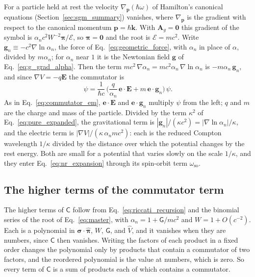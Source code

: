 \documentclass[aps,prd,onecolumn,tightenlines,nofootinbib,notitlepage,11pt,floatfix]{revtex4-2}
\theoremstyle{indentedtheorem}
\begin{document}
For a particle held at rest the velocity $\nabla_{\mathbf{p}}(\hbar\omega)$ of Hamilton's canonical equations (Section~\ref{sec:sgm_summary}) vanishes, where $\nabla_{\mathbf{p}}$ is the gradient with respect to the canonical momentum $\mathbf{p}=\hbar\mathbf{k}$. With $\mathbf{A}_g=\mathbf{0}$ this gradient of the symbol is $\alpha_nc^2W^{-2}\boldsymbol{\pi}/\mathcal{E}$, so $\boldsymbol{\pi}=\mathbf{0}$ and the root is $\mathcal{E}=mc^2$. Write $\mathbf{g}_n\equiv-c^2\nabla\ln \alpha_n$, the force of Eq.~\eqref{eq:geometric_force}, with $\alpha_n$ in place of $\alpha$, divided by $m\alpha_n$; for $\alpha_n$ near $1$ it is the Newtonian field $\mathbf{g}$ of Eq.~\eqref{eq:g_grad_alpha}. Then the term $mc^2\,\nabla\alpha_n=mc^2\alpha_n\,\nabla\ln\alpha_n$ is $-m\alpha_n\,\mathbf{g}_n$, and since $\nabla V=-q\mathbf{E}$ the commutator is
\begin{equation}
    [\mathsf{N},\mathsf{X}] \, \psi = \frac{1}{\hbar c} \, \Big(\frac{q}{\alpha_n} \, \mathbf{e}\cdot\mathbf{E} + m \, \mathbf{e}\cdot\mathbf{g}_n\Big) \, \psi .
    \label{eq:commutator_gravity}
\end{equation}
As in Eq.~\eqref{eq:commutator_em}, $\mathbf{e}\cdot\mathbf{E}$ and $\mathbf{e}\cdot\mathbf{g}_n$ multiply $\psi$ from the left; $q$ and $m$ are the charge and mass of the particle. Divided by the term $\kappa^2$ of Eq.~\eqref{eq:pure_expanded}, the gravitational term is $|\mathbf{g}_n|/(\kappa c^2)=|\nabla\ln\alpha_n|/\kappa$, and the electric term is $|\nabla V|/(\kappa\,\alpha_n mc^2)$: each is the reduced Compton wavelength $1/\kappa$ divided by the distance over which the potential changes by the rest energy. Both are small for a potential that varies slowly on the scale $1/\kappa$, and they enter Eq.~\eqref{eq:nr_expansion} through its spin-orbit term $\omega_\text{so}$.

\subsection{The higher terms of the commutator term}
\label{sup:commutator_terms}

The higher terms of $\mathsf{C}$ follow from Eq.~\eqref{eq:riccati_recursion} and the binomial series of the root of Eq.~\eqref{eq:master}, with $\alpha_n=1+\mathsf{G}/mc^2$ and $W=1+O(c^{-2})$. Each is a polynomial in $\boldsymbol{\sigma}\cdot\hat{\boldsymbol{\pi}}$, $W$, $\mathsf{G}$, and $\hat{V}$, and it vanishes when they are numbers, since $\mathsf{C}$ then vanishes. Writing the factors of each product in a fixed order changes the polynomial only by products that contain a commutator of two factors, and the reordered polynomial is the value at numbers, which is zero. So every term of $\mathsf{C}$ is a sum of products each of which contains a commutator.
\end{document}
